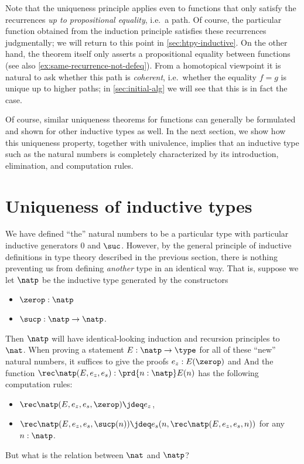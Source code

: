 Note that the uniqueness principle applies even to functions that only satisfy the recurrences \emph{up to propositional equality}, i.e.\ a path.
Of course, the particular function obtained from the induction principle satisfies these recurrences judgmentally; we will return to this point in \cref{sec:htpy-inductive}.
On the other hand, the theorem itself only asserts a propositional equality between functions (see also \cref{ex:same-recurrence-not-defeq}).
From a homotopical viewpoint it is natural to ask whether this path is \emph{coherent}, i.e.\ whether the equality $f=g$ is unique up to higher paths; in \cref{sec:initial-alg} we will see that this is in fact the case.

Of course, similar uniqueness theorems for functions can generally be formulated and shown for other inductive types as well.
In the next section, we show how this uniqueness property, together with univalence, implies that an inductive type such as the natural numbers is completely characterized by its introduction, elimination, and computation rules.

%
%


\section{Uniqueness of inductive types}
\label{sec:appetizer-univalence}

%
We have defined ``the'' natural numbers to be a particular type \nat with particular inductive generators $0$ and $\suc$.
However, by the general principle of inductive definitions in type theory described in the previous section, there is nothing preventing us from defining \emph{another} type in an identical way.
That is, suppose we let $\natp$ be the inductive type generated by the constructors
\begin{itemize}
\item $\zerop:\natp$
\item $\sucp:\natp\to\natp$.
\end{itemize}
Then $\natp$ will have identical-looking induction and recursion principles to $\nat$.
When proving a statement $E : \natp \to \type$ for all of these ``new'' natural numbers, it suffices to give the proofs $e_z : E(\zerop)$ and 
And the function $\rec\natp(E,e_z,e_s) : \prd{n:\natp} E(n)$ has the following computation rules:
\begin{itemize}
\item $\rec\natp(E,e_z,e_s,\zerop) \jdeq e_z$,
\item $\rec\natp(E,e_z,e_s,\sucp(n)) \jdeq e_s(n,\rec\natp(E,e_z,e_s,n))$ for any $n : \natp$.
\end{itemize}
But what is the relation between $\nat$ and $\natp$?

